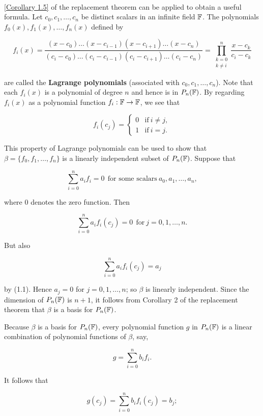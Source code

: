 \begin{definition}
	\hfill\\
	\autoref{Corollary 1.5} of the replacement theorem can be applied to obtain a useful formula. Let $c_0, c_1, \dots, c_n$ be distinct scalars in an infinite field $\mathbb{F}$. The polynomials $f_0(x), f_1(x), \dots, f_n(x)$ defined by

	\[f_i(x) = \frac{(x-c_0)\dots(x-c_{i-1})(x-c_{i+1})\dots(x-c_n)}{(c_i - c_0)\dots(c_i-c_{i-1})(c_i-c_{i+1})\dots(c_i-c_n)} = \prod_{\substack{k=0 \\ k \neq i}}^{n} \frac{x-c_k}{c_i - c_k}\]

	are called the \textbf{Lagrange polynomials} (associated with $c_0, c_1, \dots, c_n$). Note that each $f_i(x)$ is a polynomial of degree $n$ and hence is in $P_n(\mathbb{F})$. By regarding $f_i(x)$ as a polynomial function $f_i: \mathbb{F} \to \mathbb{F}$, we see that

	\begin{equation}
		f_i(c_j) = \begin{cases}
			0 & \text{if}\ i \neq j, \\
			1 & \text{if}\ i = j.
		\end{cases}
	\end{equation}

	This property of Lagrange polynomials can be used to show that $\beta = \{f_0, f_1, \dots, f_n\}$ is a linearly independent subset of $P_n(\mathbb{F})$. Suppose that

	\[\sum_{i=0}^{n}a_if_i = 0\ \ \text{for some scalars}\ a_0, a_1, \dots, a_n,\]

	where $0$ denotes the zero function. Then

	\[\sum_{i=0}^{n}a_if_i(c_j)=0\ \ \text{for}\ j=0, 1, \dots, n.\]

	But also

	\[\sum_{i=0}^{n}a_if_i(c_j)=a_j\]

	by (1.1). Hence $a_j = 0$ for $j = 0, 1, \dots, n$; so $\beta$ is linearly independent. Since the dimension of $P_n(\mathbb{F})$ is $n + 1$, it follows from Corollary 2 of the replacement theorem that $\beta$ is a basis for $P_n(\mathbb{F})$.

	Because $\beta$ is a basis for $P_n(\mathbb{F})$, every polynomial function $g$ in $P_n(\mathbb{F})$ is a linear combination of polynomial functions of $\beta$, say,

	\[g = \sum_{i=0}^{n}b_if_i.\]

	It follows that

	\[g(c_j)=\sum_{i=0}^{n}b_if_i(c_j)=b_j;\]


\end{definition}

